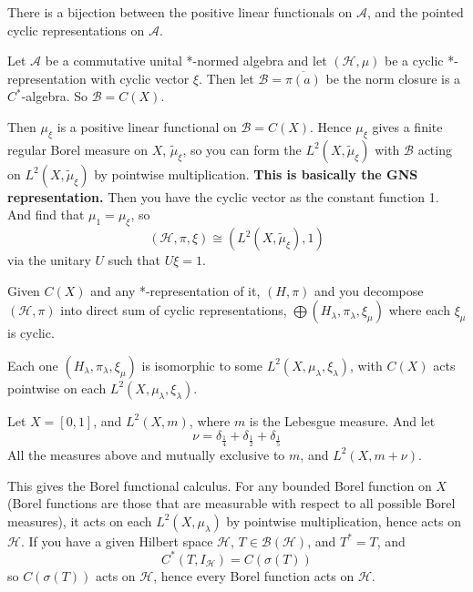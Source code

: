 \begin{comment}
    You start with $\mu_\xi$, and do GNS, and get something unitarily equivalent to what you start with.
\end{comment}
\begin{corollary}
    There is a bijection between the positive linear functionals on $\mathcal{A}$, and the pointed cyclic representations on $\mathcal{A}$. 
\end{corollary}

Let $\mathcal{A}$ be a commutative unital *-normed algebra and let $(\mathcal{H}, \mu)$ be a cyclic *-representation with cyclic vector $\xi$. Then let $\mathcal{B}=\overline{\pi(a)}$ be the norm closure is a $C^*$-algebra. So $\mathcal{B}=C(X)$.

Then $\mu_\xi$ is a positive linear functional on $\mathcal{B}=C(X)$. Hence $\mu_\xi$ gives a finite regular Borel measure on $X$, $\tilde{\mu}_\xi$, so you can form the $L^2(X,\tilde{\mu}_\xi)$ with $\mathcal{B}$ acting on $L^2(X, \tilde{\mu}_\xi)$ by pointwise multiplication. \textbf{ This is basically the GNS representation.} Then you have the cyclic vector as the constant function 1. And find that $\mu_1=\mu_\xi$, so
\begin{equation*}
    (\mathcal{H}, \pi, \xi)\cong (L^2(X, \tilde{\mu}_\xi), 1)
\end{equation*}
via the unitary $U$ such that $U\xi=1$.

Given $C(X)$ and any *-representation of it, $(H, \pi)$ and you decompose $(\mathcal{H}, \pi)$ into direct sum of cyclic representations, $\bigoplus(H_\lambda, \pi_\lambda, \xi_\mu)$ where each $\xi_\mu$ is cyclic.

Each one $(H_\lambda, \pi_\lambda, \xi_\mu)$ is isomorphic to some $L^2(X,\mu_\lambda, \xi_\lambda)$, with $C(X)$ acts pointwise on each $L^2(X,\mu_\lambda, \xi_\lambda)$.
\begin{example}
Let $X=[0,1]$, and $L^2(X, m)$, where $m$ is the Lebesgue measure. And let 
\begin{equation*}
    \nu=\delta_\frac{1}{4}+\delta_\frac{1}{2}+\delta_\frac{1}{5}
\end{equation*}
All the measures above and mutually exclusive to $m$, and $L^2(X, m+\nu)$.
\end{example}

This gives the Borel functional calculus. For any bounded Borel function on $X$ (Borel functions are those that are measurable with respect to all possible Borel measures), it acts on each $L^2(X,\mu_\lambda)$ by pointwise multiplication, hence acts on $\mathcal{H}$. If you have a given Hilbert space $\mathcal{H}$, $T\in\mathcal{B}(\mathcal{H})$, and $T^*=T$, and
\begin{equation*}
    C^*(T, I_\mathcal{H})=C(\sigma(T))
\end{equation*}
so $C(\sigma(T))$ acts on $\mathcal{H}$, hence every Borel function acts on $\mathcal{H}$. 

